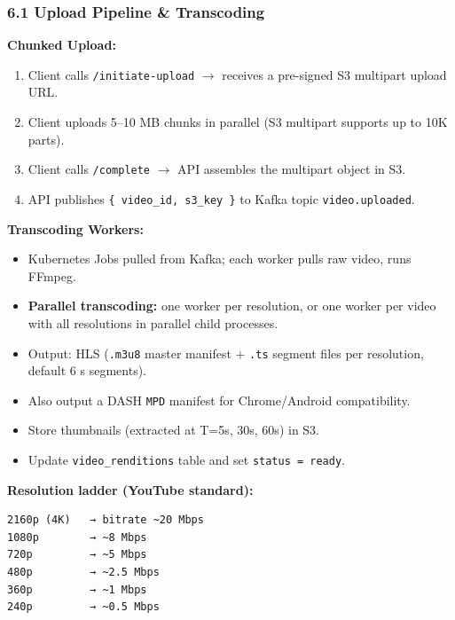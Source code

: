 \documentclass[11pt]{article}
\providecommand{\tightlist}{\setlength{\itemsep}{1pt}\setlength{\parskip}{0pt}}
\begin{document}
\subsubsection{6.1 Upload Pipeline \& Transcoding}\label{61-upload-pipeline--transcoding}

\textbf{Chunked Upload:}

\begin{enumerate}
\def\labelenumi{\arabic{enumi}.}
\tightlist
\item
  Client calls \texttt{/initiate-upload} \(\rightarrow\) receives a pre-signed S3 multipart upload URL.
\item
  Client uploads 5--10 MB chunks in parallel (S3 multipart supports up to 10K parts).
\item
  Client calls \texttt{/complete} \(\rightarrow\) API assembles the multipart object in S3.
\item
  API publishes \texttt{\{\ video\_id,\ s3\_key\ \}} to Kafka topic \texttt{video.uploaded}.
\end{enumerate}

\textbf{Transcoding Workers:}

\begin{itemize}
\tightlist
\item
  Kubernetes Jobs pulled from Kafka; each worker pulls raw video, runs FFmpeg.
\item
  \textbf{Parallel transcoding:} one worker per resolution, or one worker per video with all resolutions in parallel child processes.
\item
  Output: HLS (\texttt{.m3u8} master manifest + \texttt{.ts} segment files per resolution, default 6 s segments).
\item
  Also output a DASH \texttt{MPD} manifest for Chrome/Android compatibility.
\item
  Store thumbnails (extracted at T=5s, 30s, 60s) in S3.
\item
  Update \texttt{video\_renditions} table and set \texttt{status\ =\ \textquotesingle{}ready\textquotesingle{}}.
\end{itemize}

\textbf{Resolution ladder (YouTube standard):}

\setcodelang{}

\begin{verbatim}
2160p (4K)   → bitrate ~20 Mbps
1080p        → ~8 Mbps
720p         → ~5 Mbps
480p         → ~2.5 Mbps
360p         → ~1 Mbps
240p         → ~0.5 Mbps
\end{verbatim}
\end{document}
